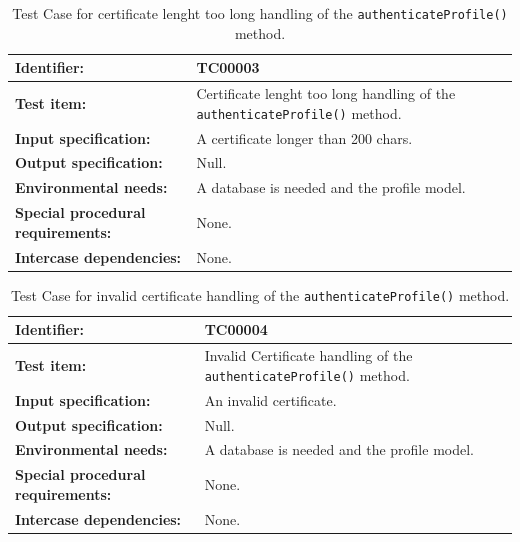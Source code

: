 \begin{table}[htbp]
	\centering
		\begin{tabular}{| p{4.5cm} | m{9cm} |}
			\hline
			\textbf{Identifier:} 					& TC00003 \\ \hline
			\textbf{Test item:}						& Certificate lenght too long handling of the \texttt{authenticateProfile()} method. \\ \hline
			\textbf{Input specification:}			& A certificate longer than 200 chars. \\ \hline
			\textbf{Output specification:} 			& Null. \\ \hline
			\textbf{Environmental needs:}			& A database is needed and the profile model. \\ \hline
			\textbf{Special procedural requirements:}	& None. \\ \hline
			\textbf{Intercase dependencies:}			& None. \\ \hline
		\end{tabular}
	\caption{Test Case for certificate lenght too long handling of the \texttt{authenticateProfile()} method.}
	\label{tab:TestCase_CertificateToLongHandling}
\end{table}

\begin{table}[htbp]
	\centering
		\begin{tabular}{| p{4.5cm} | m{9cm} |}
			\hline
			\textbf{Identifier:} 					& TC00004 \\ \hline
			\textbf{Test item:}						& Invalid Certificate handling of the \texttt{authenticateProfile()} method. \\ \hline
			\textbf{Input specification:}			& An invalid certificate. \\ \hline
			\textbf{Output specification:} 			& Null. \\ \hline
			\textbf{Environmental needs:}			& A database is needed and the profile model. \\ \hline
			\textbf{Special procedural requirements:}	& None. \\ \hline
			\textbf{Intercase dependencies:}			& None. \\ \hline
		\end{tabular}
	\caption{Test Case for invalid certificate handling of the \texttt{authenticateProfile()} method.}
	\label{tab:TestCase_InvalidCertificateHandling}
\end{table}

